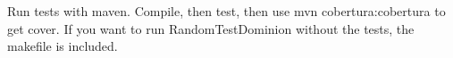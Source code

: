 Run tests with maven. Compile, then test, then use mvn cobertura:cobertura to get cover. If you want to run RandomTestDominion without the tests, the makefile is included. 

